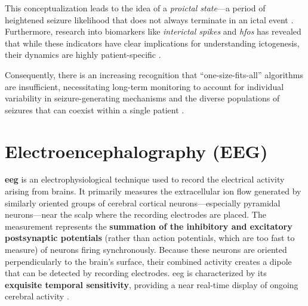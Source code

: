 This conceptualization leads to the idea of a \textit{proictal state}---a period of heightened seizure likelihood that does not always terminate in an ictal event \parencite{muller_coherent_2022}.
Furthermore, research into biomarkers like \textit{interictal spikes} and \textit{\glspl{hfo}} has revealed that while these indicators have clear implications for understanding ictogenesis, their dynamics are highly patient-specific \parencite{freestone_forward-looking_2017}.

Consequently, there is an increasing recognition that \enquote{one-size-fits-all} algorithms are insufficient, necessitating long-term monitoring to account for individual variability in seizure-generating mechanisms and the diverse populations of seizures that can coexist within a single patient \parencite{freestone_forward-looking_2017, yang_seizure_2024}.



\section{Electroencephalography (EEG)}\label{sec:eeg-background}

\textbf{\Gls{eeg}} is an electrophysiological technique used to record the electrical activity arising from brains.
It primarily measures the extracellular ion flow generated by similarly oriented groups of cerebral cortical neurons---especially pyramidal neurons---near the scalp where the recording electrodes are placed.
The measurement represents the \textbf{summation of the inhibitory and excitatory postsynaptic potentials} (rather than action potentials, which are too fast to measure) of neurons firing synchronously.
Because these neurons are oriented perpendicularly to the brain's surface, their combined activity creates a dipole that can be detected by recording electrodes.
\gls{eeg} is characterized by its \textbf{exquisite temporal sensitivity}, providing a near real-time display of ongoing cerebral activity \parencite{st_louis_electroencephalography_2016}.

